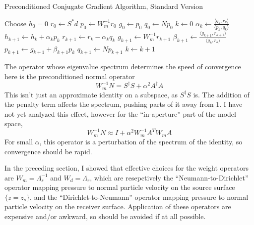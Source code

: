 \begin{algorithm}[H]
\caption{Preconditioned Conjugate Gradient Algorithm, Standard Version}
\begin{algorithmic}[1]
\State Choose $h_0=0$ 
  \State $r_0 \gets S^*d$
  \State $p_0 \gets W_m^{-1}r_0$
  \State $g_0 \gets p_0$
  \State $q_0 \gets Np_0$
  \State $k \gets 0$
  \Repeat
  \State $\alpha_k \gets \frac{\langle g_k,r_k \rangle}{\langle p_k,q_k\rangle}$
  \State $h_{k+1} \gets h_k + \alpha_k p_k$
  \State $r_{k+1} \gets r_k - \alpha_kq_k$
  \State $g_{k+1} \gets W_m^{-1}r_{k+1}$
  \State $\beta_{k+1} \gets \frac{\langle g_{k+1},r_{k+1}\rangle}{\langle g_k,r_k\rangle}$
  \State $p_{k+1}\gets g_{k+1}+\beta_{k+1}p_k$
  \State $q_{k+1} \gets Np_{k+1}$
  \State $k \gets k+1$
\end{algorithmic}
\end{algorithm}

The operator whose eigenvalue spectrum determines the speed of convergence here is the preconditioned normal operator
\begin{equation}
  \label{eqn:pno}
  W_m^{-1}N = S^{\dagger}S +\alpha^2 A^{\dagger}A
\end{equation}
This isn't just an approximate identity on a subspace, as $S^{\dagger}S$ is. The addition of the penalty term affects the spectrum, pushing parts of it away from $1$. I have not yet analyzed this effect, however for the ``in-aperture'' part of the model space,
\[
  W_m^{-1}N \approx I +\alpha^2 W_m^{-1}A^TW_mA
\]
For small $\alpha$, this operator is a perturbation of the spectrum of the identity, so convergence should be rapid. 

In the preceding section, I showed that effective choices for the weight operators are $W_m = \Lambda_s^{-1}$ and $W_d = \Lambda_r$, which are resepctively the ``Neumann-to-Dirichlet'' operator mapping pressure to normal particle velocity on the source surface $\{z=z_s\}$, and the ``Dirichlet-to-Neumann'' operator mapping pressure to normal particle velocity on the receiver surface. Application of these operators are expensive and/or awkward, so should be avoided if at all possible. 

